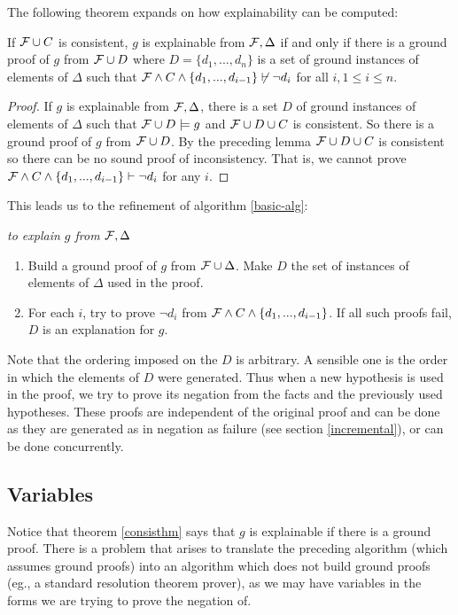 The following theorem expands on how explainability can be computed:
\begin{theorem} \label{consisthm}
If ${\cal F} \cup C$ is consistent,
$g$ is explainable from ${\cal F},\Delta$ if and only if there is a ground
proof of $g$ from ${\cal F}\cup D$ where $D=\{d_1,...,d_n\}$
is a set of ground instances
of elements of $\Delta$ such that
${\cal F} \wedge C \wedge \{d_1,...,d_{i-1}\}\not\vdash \neg d_i$
for all $i,1\leq i \leq n$.
\end{theorem}
\begin{proof}
If $g$ is explainable from ${\cal F},\Delta$, there is a set $D$ of ground instances
of elements of $\Delta$ such that ${\cal F}\cup D \models g$ and ${\cal F} \cup D \cup C$
is consistent. So there is a ground proof of $g$ from ${\cal F} \cup D$.
By the preceding lemma
${\cal F}\cup D \cup C$ is consistent so there can be no sound proof
of inconsistency. That is, we cannot prove
${\cal F} \wedge C \wedge \{d_1,...,d_{i-1}\}\vdash \neg d_i$ for any $i$.
\end{proof}

This leads us to the refinement of algorithm \ref{basic-alg}:
\begin{algorithm} \em
to explain $g$ from ${\cal F},\Delta$
\begin{enumerate}
\item Build a ground proof of $g$ from ${\cal F}\cup \Delta$. Make $D$ 
the set of instances of elements of $\Delta$ used in the proof.
\item For each $i$, try to prove $\neg d_i$ from ${\cal F} \wedge C
\wedge \{d_1,...,d_{i-1}\}$. If all
such proofs fail, $D$ is an explanation for $g$.
\end{enumerate}
\end{algorithm}

Note that the ordering imposed on the $D$ is arbitrary. A sensible one is
the order in which the elements of $D$ were generated. Thus when
a new hypothesis is used in the proof, we try to prove its negation from
the facts and the previously used hypotheses. These proofs are independent
of the original proof and can be done as they are generated
as in negation as failure (see section \ref{incremental}), or can be done
concurrently.

\subsection{Variables}
Notice that theorem \ref{consisthm} says that $g$ is explainable
if there is a ground proof. There is a problem that arises
to translate the preceding algorithm (which assumes ground proofs)
into an algorithm which does not build ground proofs (eg., a standard
resolution theorem prover), as we may have variables in the forms
we are trying to prove the negation of.

